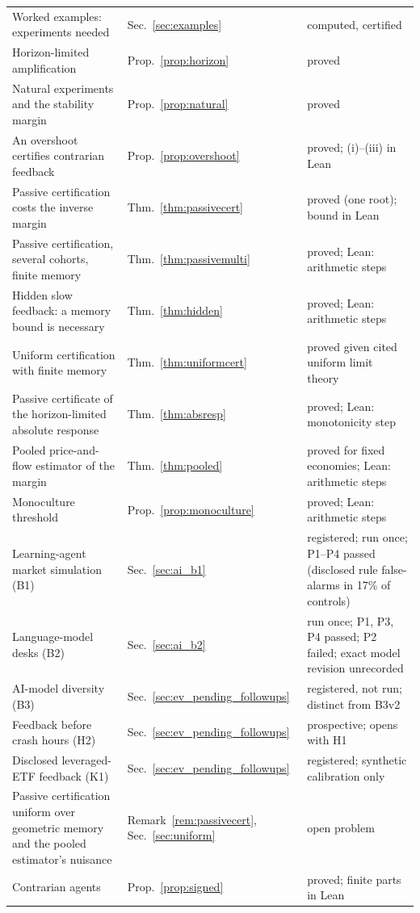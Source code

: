 \begin{longtable}{p{}p{}p{}}
Worked examples: experiments needed & Sec.~\ref{sec:examples} & computed, certified\\
Horizon-limited amplification & Prop.~\ref{prop:horizon} & proved\\
Natural experiments and the stability margin & Prop.~\ref{prop:natural} & proved\\
An overshoot certifies contrarian feedback & Prop.~\ref{prop:overshoot} & proved; (i)--(iii) in Lean\\
Passive certification costs the inverse margin & Thm.~\ref{thm:passivecert} & proved (one root); bound in Lean\\
Passive certification, several cohorts, finite memory & Thm.~\ref{thm:passivemulti} & proved; Lean: arithmetic steps\\
Hidden slow feedback: a memory bound is necessary & Thm.~\ref{thm:hidden} & proved; Lean: arithmetic steps\\
Uniform certification with finite memory & Thm.~\ref{thm:uniformcert} & proved given cited uniform limit theory\\
Passive certificate of the horizon-limited absolute response & Thm.~\ref{thm:absresp} & proved; Lean: monotonicity step\\
Pooled price-and-flow estimator of the margin & Thm.~\ref{thm:pooled} & proved for fixed economies; Lean: arithmetic steps\\
Monoculture threshold & Prop.~\ref{prop:monoculture} & proved; Lean: arithmetic steps\\
Learning-agent market simulation (B1) & Sec.~\ref{sec:ai_b1} & registered; run once; P1--P4 passed (disclosed rule false-alarms in 17\% of controls)\\
Language-model desks (B2) & Sec.~\ref{sec:ai_b2} & run once; P1, P3, P4 passed; P2 failed; exact model revision unrecorded\\
AI-model diversity (B3) & Sec.~\ref{sec:ev_pending_followups} & registered, not run; distinct from B3v2\\
Feedback before crash hours (H2) & Sec.~\ref{sec:ev_pending_followups} & prospective; opens with H1\\
Disclosed leveraged-ETF feedback (K1) & Sec.~\ref{sec:ev_pending_followups} & registered; synthetic calibration only\\
Passive certification uniform over geometric memory and the pooled estimator's nuisance & Remark~\ref{rem:passivecert}, Sec.~\ref{sec:uniform} & open problem\\
Contrarian agents & Prop.~\ref{prop:signed} & proved; finite parts in Lean\\

\end{longtable}
